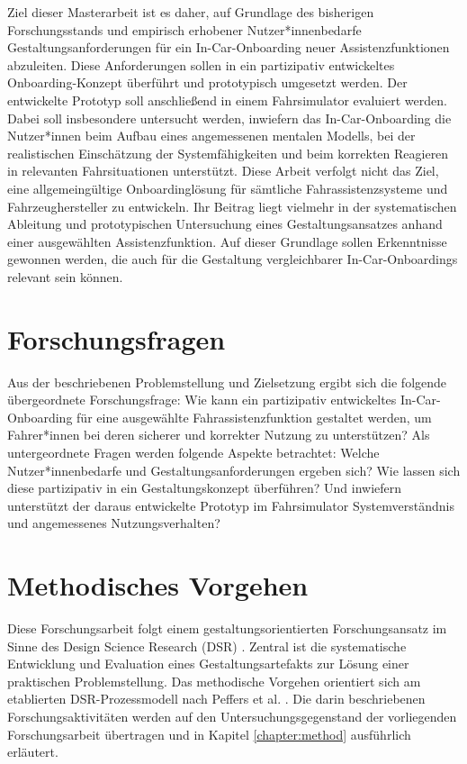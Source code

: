 Ziel dieser Masterarbeit ist es daher, auf Grundlage des bisherigen Forschungsstands und empirisch erhobener Nutzer*innenbedarfe Gestaltungsanforderungen für ein In-Car-Onboarding neuer Assistenzfunktionen abzuleiten. Diese Anforderungen sollen in ein partizipativ entwickeltes Onboarding-Konzept überführt und prototypisch umgesetzt werden.
Der entwickelte Prototyp soll anschließend in einem Fahrsimulator evaluiert werden. Dabei soll insbesondere untersucht werden, inwiefern das In-Car-Onboarding die Nutzer*innen beim Aufbau eines angemessenen mentalen Modells, bei der realistischen Einschätzung der Systemfähigkeiten und beim korrekten Reagieren in relevanten Fahrsituationen unterstützt. Diese Arbeit verfolgt nicht das Ziel, eine allgemeingültige Onboardinglösung für sämtliche Fahrassistenzsysteme und Fahrzeughersteller zu entwickeln. Ihr Beitrag liegt vielmehr in der systematischen Ableitung und prototypischen Untersuchung eines Gestaltungsansatzes anhand einer ausgewählten Assistenzfunktion. Auf dieser Grundlage sollen Erkenntnisse gewonnen werden, die auch für die Gestaltung vergleichbarer In-Car-Onboardings relevant sein können.


\section{Forschungsfragen}
\label{sec:forschungsfragen}

Aus der beschriebenen Problemstellung und Zielsetzung ergibt sich die folgende übergeordnete Forschungsfrage: Wie kann ein partizipativ entwickeltes In-Car-Onboarding für eine ausgewählte Fahrassistenzfunktion gestaltet werden, um Fahrer*innen bei deren sicherer und korrekter Nutzung zu unterstützen? Als untergeordnete Fragen werden folgende Aspekte betrachtet: Welche Nutzer*innenbedarfe und Gestaltungsanforderungen ergeben sich? Wie lassen sich diese partizipativ in ein Gestaltungskonzept überführen? Und inwiefern unterstützt der daraus entwickelte Prototyp im Fahrsimulator Systemverständnis und angemessenes Nutzungsverhalten?


\section{Methodisches Vorgehen}
\label{sec:methodisches_vorgehen}

Diese Forschungsarbeit folgt einem gestaltungsorientierten Forschungsansatz im Sinne des Design Science Research (DSR) \cite{hevner2004design,peffers2007design}. Zentral ist die systematische Entwicklung und Evaluation eines Gestaltungsartefakts zur Lösung einer praktischen Problemstellung. Das methodische Vorgehen orientiert sich am etablierten DSR-Prozessmodell nach Peffers et al. \cite{peffers2007design}. Die darin beschriebenen Forschungsaktivitäten werden auf den Untersuchungsgegenstand der vorliegenden Forschungsarbeit übertragen und in Kapitel \ref{chapter:method} ausführlich erläutert.

